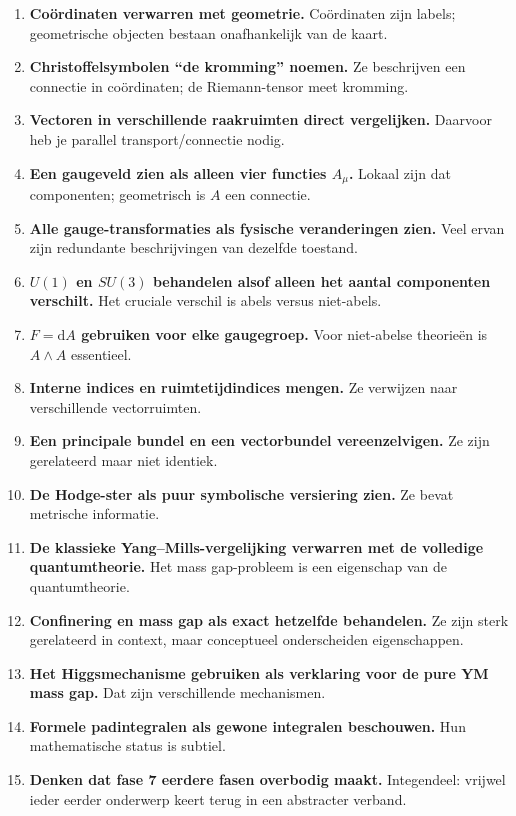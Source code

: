 \documentclass[11pt,a4paper]{article}
\newcommand{\dd}{\mathrm{d}}
\begin{document}
\begin{enumerate}
\item \textbf{Coördinaten verwarren met geometrie.} Coördinaten zijn labels; geometrische objecten bestaan onafhankelijk van de kaart.
\item \textbf{Christoffelsymbolen ``de kromming'' noemen.} Ze beschrijven een connectie in coördinaten; de Riemann-tensor meet kromming.
\item \textbf{Vectoren in verschillende raakruimten direct vergelijken.} Daarvoor heb je parallel transport/connectie nodig.
\item \textbf{Een gaugeveld zien als alleen vier functies $A_\mu$.} Lokaal zijn dat componenten; geometrisch is $A$ een connectie.
\item \textbf{Alle gauge-transformaties als fysische veranderingen zien.} Veel ervan zijn redundante beschrijvingen van dezelfde toestand.
\item \textbf{$U(1)$ en $SU(3)$ behandelen alsof alleen het aantal componenten verschilt.} Het cruciale verschil is abels versus niet-abels.
\item \textbf{$F=\dd A$ gebruiken voor elke gaugegroep.} Voor niet-abelse theorieën is $A\wedge A$ essentieel.
\item \textbf{Interne indices en ruimtetijdindices mengen.} Ze verwijzen naar verschillende vectorruimten.
\item \textbf{Een principale bundel en een vectorbundel vereenzelvigen.} Ze zijn gerelateerd maar niet identiek.
\item \textbf{De Hodge-ster als puur symbolische versiering zien.} Ze bevat metrische informatie.
\item \textbf{De klassieke Yang--Mills-vergelijking verwarren met de volledige quantumtheorie.} Het mass gap-probleem is een eigenschap van de quantumtheorie.
\item \textbf{Confinering en mass gap als exact hetzelfde behandelen.} Ze zijn sterk gerelateerd in context, maar conceptueel onderscheiden eigenschappen.
\item \textbf{Het Higgsmechanisme gebruiken als verklaring voor de pure YM mass gap.} Dat zijn verschillende mechanismen.
\item \textbf{Formele padintegralen als gewone integralen beschouwen.} Hun mathematische status is subtiel.
\item \textbf{Denken dat fase 7 eerdere fasen overbodig maakt.} Integendeel: vrijwel ieder eerder onderwerp keert terug in een abstracter verband.
\end{enumerate}
\end{document}
